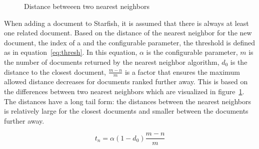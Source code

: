 \begin{figure}[h]
\caption{Distance betweeen two nearest neighbors}
\label{fig:thresholds_differences}
\end{figure}

When adding a document to Starfish, it is assumed that there is always at least one related document. Based on the distance of the nearest neighbor for the new document, the index of a and the configurable parameter, the threshold is defined as in equation~\ref{eq:thresh}. In this equation, $\alpha$ is the configurable parameter, $m$ is the number of documents returned by the nearest neighbor algorithm, $d_0$ is the distance to the closest document, $\frac{m - n}{m}$ is a factor that ensures the maximum allowed distance decreases for documents ranked further away. This is based on the differences between two nearest neighbors which are visualized in figure~\ref{fig:thresholds_differences}. The distances have a long tail form: the distances between the nearest neighbors is relatively large for the closest documents and smaller between the documents further away. 

\begin{equation}
t_n = \alpha (1 - d_0) \frac{m - n}{m}
\label{eq:thresh}
\end{equation}